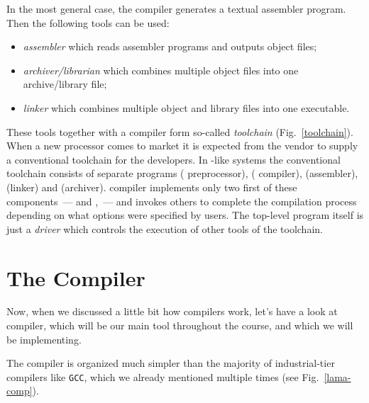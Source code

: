 In the most general case, the compiler generates a textual assembler program. Then the following tools can be used:

\FloatBarrier

\begin{itemize}
\item \emph{assembler} which reads assembler programs and outputs object files;
\item \emph{archiver/librarian} which combines multiple object files into one archive/library file;
\item \emph{linker} which combines multiple object and library files into one executable.
\end{itemize}

These tools together with a compiler form so-called \emph{toolchain} (Fig.~\ref{toolchain}). When a new processor comes to market it is expected from
the vendor to supply a conventional toolchain for the developers. In -like systems the conventional
toolchain consists of separate programs  ( preprocessor),  ( compiler),
 (assembler),  (linker) and  (archiver).  compiler implements only two first
of these components~---  and ,~--- and invokes others to complete the compilation process
depending on what options were specified by users. The top-level program  itself is just a \emph{driver}
which controls the execution of other tools of the toolchain.

\section{The \lama Compiler}

Now, when we discussed a little bit how compilers work, let's have a look at \lama compiler, which will be our main
tool throughout the course, and which we will be implementing.

The \lama compiler is organized much simpler than the majority of industrial-tier compilers like \texttt{GCC}, which we already
mentioned multiple times (see Fig.~\ref{lama-comp}).

